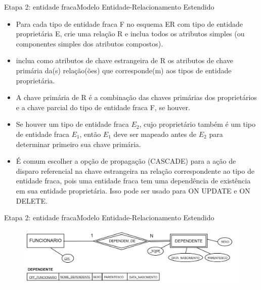 \documentclass[t]{beamer}
\begin{document}
\begin{ftst}{Etapa 2: entidade fraca}{Modelo Entidade-Relacionamento Estendido}
\small
\begin{itemize}
    \item Para cada tipo de entidade fraca F no esquema ER com tipo de entidade proprietária E, crie uma relação R e inclua todos os atributos simples (ou componentes simples dos atributos compostos).
    \item inclua como atributos de chave estrangeira de R os atributos de chave primária da(s) relação(ões) que corresponde(m) aos tipos de entidade proprietária.
    \item A chave primária de R é a combinação das chaves primárias dos proprietários e a chave parcial do tipo de entidade fraca F, se houver.
    \item Se houver um tipo de entidade fraca $E_2$, cujo proprietário também é um tipo de entidade fraca $E_1$, então $E_1$ deve ser mapeado antes de $E_2$ para determinar primeiro sua chave primária.
    \item É comum escolher a opção de propagação (CASCADE) para a ação de disparo referencial na chave estrangeira na relação correspondente ao tipo de entidade fraca, pois uma entidade fraca tem uma dependência de existência em sua entidade proprietária. Isso pode ser usado para ON UPDATE e ON DELETE.
    
\end{itemize}
\end{ftst}


\begin{ftst}{Etapa 2: entidade fraca}{Modelo Entidade-Relacionamento Estendido}
\vone
\vone
\begin{figure}
    \centering
    \includegraphics[scale=0.15]{Figuras/03_04.png}
\end{figure}
\end{ftst}

\end{document}
